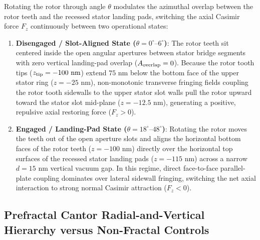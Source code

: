 \documentclass[11pt,letterpaper]{article}
\begin{document}
Rotating the rotor through angle $\theta$ modulates the azimuthal overlap between the rotor teeth and the recessed stator landing pads, switching the axial Casimir force $F_z$ continuously between two operational states:
\begin{enumerate}
    \item \textbf{Disengaged / Slot-Aligned State ($\theta = 0^\circ\text{--}6^\circ$)}: The rotor teeth sit centered inside the open angular apertures between stator bridge segments with zero vertical landing-pad overlap ($A_{\rm overlap} = 0$). Because the rotor tooth tips ($z_{\rm tip} = -100\text{ nm}$) extend $75\text{ nm}$ below the bottom face of the upper stator ring ($z = -25\text{ nm}$), non-monotonic transverse fringing fields coupling the rotor tooth sidewalls to the upper stator slot walls pull the rotor upward toward the stator slot mid-plane ($z = -12.5\text{ nm}$), generating a positive, repulsive axial restoring force ($F_z > 0$).
    \item \textbf{Engaged / Landing-Pad State ($\theta = 18^\circ\text{--}48^\circ$)}: Rotating the rotor moves the teeth out of the open aperture slots and aligns the horizontal bottom faces of the rotor teeth ($z = -100\text{ nm}$) directly over the horizontal top surfaces of the recessed stator landing pads ($z = -115\text{ nm}$) across a narrow $d = 15\text{ nm}$ vertical vacuum gap. In this regime, direct face-to-face parallel-plate coupling dominates over lateral sidewall fringing, switching the net axial interaction to strong normal Casimir attraction ($F_z < 0$).
\end{enumerate}

\subsection{Prefractal Cantor Radial-and-Vertical Hierarchy versus Non-Fractal Controls}
\end{document}
